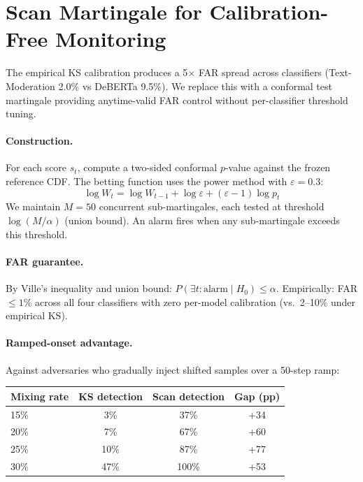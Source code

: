 \documentclass{article}
\begin{document}
\section{Scan Martingale for Calibration-Free Monitoring}
\label{app:martingale}

The empirical KS calibration produces a 5$\times$ FAR spread across classifiers (Text-Moderation 2.0\% vs DeBERTa 9.5\%). We replace this with a conformal test martingale providing anytime-valid FAR control without per-classifier threshold tuning.

\paragraph{Construction.} For each score $s_t$, compute a two-sided conformal $p$-value against the frozen reference CDF. The betting function uses the power method with $\varepsilon = 0.3$:
\begin{equation}
\log W_t = \log W_{t-1} + \log \varepsilon + (\varepsilon - 1) \log p_t
\end{equation}
We maintain $M = 50$ concurrent sub-martingales, each tested at threshold $\log(M/\alpha)$ (union bound). An alarm fires when any sub-martingale exceeds this threshold.

\paragraph{FAR guarantee.} By Ville's inequality and union bound: $P(\exists t: \text{alarm} \mid H_0) \leq \alpha$. Empirically: FAR $\leq 1\%$ across all four classifiers with zero per-model calibration (vs.\ 2--10\% under empirical KS).

\paragraph{Ramped-onset advantage.} Against adversaries who gradually inject shifted samples over a 50-step ramp:

\begin{table}[h]
\centering
\small
\begin{tabular}{lccc}
\toprule
\textbf{Mixing rate} & \textbf{KS detection} & \textbf{Scan detection} & \textbf{Gap (pp)} \\
\midrule
15\% & 3\% & 37\% & +34 \\
20\% & 7\% & 67\% & +60 \\
25\% & 10\% & 87\% & +77 \\
30\% & 47\% & 100\% & +53 \\
\bottomrule
\end{tabular}
\end{table}
\end{document}
